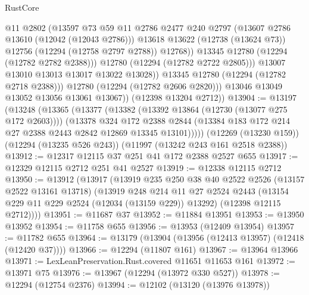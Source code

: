 \begin{lexlean}{RustCore}
\begin{coremodule}
                        @11
                        @2802
                        (@13597
                          @73
                          @59
                          @11
                          @2786
                          @2477
                          @240
                          @2797
                          (@13607 @2786 @13610 (@12042 (@12043 @2786)))
                          @13618
                          @13622
                          (@12738 (@13624 @73))
                          @12756
                          (@12294 (@12758 @2797 @2788))
                          @12768))
                      @13345
                      @12780
                      (@12294 (@12782 @2782 @2388)))
                    @12780
                    (@12294 (@12782 @2722 @2805)))
                  @13007
                  @13010
                  @13013
                  @13017
                  @13022
                  @13028))
              @13345
              @12780
              (@12294 (@12782 @2718 @2388)))
            @12780
            (@12294 (@12782 @2606 @2820)))
          @13046
          @13049
          @13052
          @13056
          @13061
          @13067))
      (@12398 @13204 @2712))
@13904 := @13197
    (@13248
      (@13365
        (@13377
          (@13382 (@13392 @13864 (@12730 (@13077 @275 @172 @2603))))
          (@13378
            @324
            @172
            @2388
            @2844
            (@13384 @183 @172 @214 @27 @2388 @2443 @2842 @12869 @13345 @13101)))))
    (@12269 (@13230 @159))
    (@12294 (@13235 @526 @243))
    (@11997 (@13242 @243 @161 @2518 @2388))
@13912 := @12317 @12115 @37 @251 @41 @172 @2388 @2527 @655
@13917 := @12329 @12115 @2712 @251 @41 @2527
@13919 := @12338 @12115 @2712
@13950 := @13912
    (@13917
      (@13919
        @235
        @250
        @38
        @40
        @2522
        @2526
        (@13157 @2522 @13161 @13718)
        (@13919
          @248
          @214
          @11
          @27
          @2524
          @2443
          (@13154 @229 @11 @229 @2524 (@12034 (@13159 @229)) @13292)
          (@12398 @12115 @2712))))
@13951 := @11687 @37
@13952 := @11884 @13951
@13953 := @13950 @13952
@13954 := @11758 @655
@13956 := @13953 (@12409 @13954)
@13957 := @11782 @655
@13964 := @13179 (@13904 (@13956 (@12413 @13957) (@12418 (@12420 @37))))
@13966 := @12294 (@11807 @161)
@13967 := @13964 @13966
@13971 := LexLeanPreservation.Rust.covered @11651 @11653 @161
@13972 := @13971 @75
@13976 := @13967 (@12294 (@13972 @330 @527))
@13978 := @12294 (@12754 @2376)
@13994 := @12102
    (@13120 (@13976 @13978))

\end{coremodule}
\end{lexlean}
